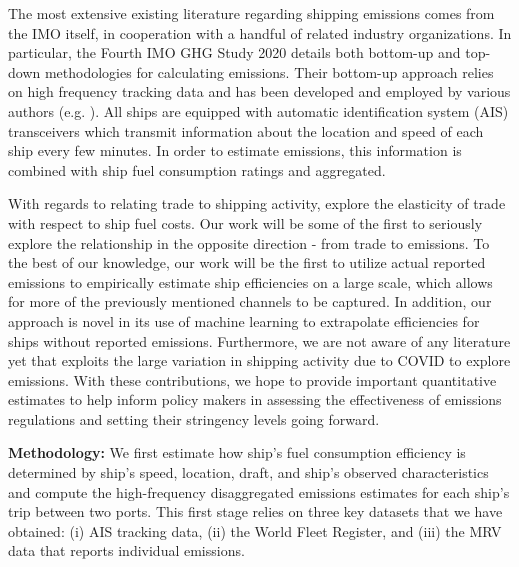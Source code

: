 \documentclass[hidelinks, 12pt,letterpaper]{article}
\begin{document}
The most extensive existing literature regarding shipping emissions comes from the IMO itself, in cooperation with a handful of related industry organizations. In particular, the Fourth IMO GHG Study 2020 \citep{faber2020fourth} details both bottom-up and top-down methodologies for calculating emissions. Their bottom-up approach relies on high frequency tracking data and has been developed and employed by various authors (e.g. \citet{olmer2017greenhouse, johansson2017global, jalkanen2009modelling, van2018spatially}). All ships are equipped with automatic identification system (AIS) transceivers which transmit information about the location and speed of each ship every few minutes. In order to estimate emissions, this information is combined with ship fuel consumption ratings and aggregated.

With regards to relating trade to shipping activity, \citet{brancaccio2018impact} explore the elasticity of trade with respect to ship fuel costs. Our work will be some of the first to seriously explore the relationship in the opposite direction - from trade to emissions. To the best of our knowledge, our work will be the first to utilize actual reported emissions to empirically estimate ship efficiencies on a large scale, which allows for more of the previously mentioned channels to be captured. In addition, our approach is novel in its use of machine learning to extrapolate efficiencies for ships without reported emissions. Furthermore, we are not aware of any literature yet that exploits the large variation in shipping activity due to COVID to explore emissions. With these contributions, we hope to provide important quantitative estimates to help inform policy makers in assessing the effectiveness of emissions regulations and setting their stringency levels going forward.


\smallskip

\noindent \textbf{Methodology:}  We first estimate how ship's fuel consumption efficiency  is determined by ship's speed, location, draft, and ship's observed characteristics and compute the  high-frequency disaggregated emissions estimates for each ship's trip  between two ports. This first stage relies on three key datasets that we have obtained: (i) AIS tracking data, (ii)  the World Fleet Register, and (iii) the MRV data that reports individual emissions.
\end{document}

